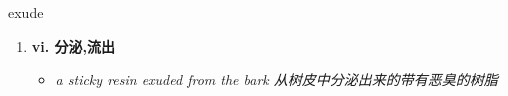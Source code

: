 
\begin{frame}
{\huge exude}
\begin{center}
\begin{enumerate}\Large
  \item \textbf{vi. 分泌,流出}
  \begin{itemize}
    \item \em{\Large{a sticky resin exuded from the bark 从树皮中分泌出来的带有恶臭的树脂}}
  \end{itemize}
\end{enumerate}
\end{center}
\end{frame}
